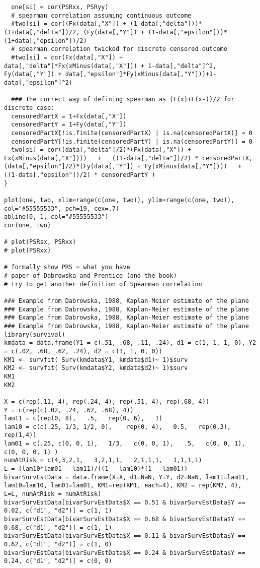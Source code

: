 \documentclass[]{article}
\begin{document}
{{\begin{verbatim}
  one[si] = cor(PSRxx, PSRyy)
  # spearman correlation assuming continuous outcome
  #two[si] = cor((Fx(data[,"X"]) + (1-data[,"delta"]))*(1+data[,"delta"])/2, (Fy(data[,"Y"]) + (1-data[,"epsilon"]))*(1+data[,"epsilon"])/2)
  # spearman correlation twicked for discrete censored outcome
  #two[si] = cor(Fx(data[,"X"]) + data[,"delta"]*Fx(xMinus(data[,"X"])) + 1-data[,"delta"]^2, Fy(data[,"Y"]) + data[,"epsilon"]*Fy(xMinus(data[,"Y"]))+1-data[,"epsilon"]^2)

  ### The correct way of defining spearman as (F(x)+F(x-))/2 for discrete case:
  censoredPartX = 1+Fx(data[,"X"])
  censoredPartY = 1+Fy(data[,"Y"])
  censoredPartX[!is.finite(censoredPartX) | is.na(censoredPartX)] = 0
  censoredPartY[!is.finite(censoredPartY) | is.na(censoredPartY)] = 0
  two[si] = cor((data[,"delta"]/2)*(Fx(data[,"X"]) + Fx(xMinus(data[,"X"])))   +   ((1-data[,"delta"])/2) * censoredPartX,   (data[,"epsilon"]/2)*(Fy(data[,"Y"]) + Fy(xMinus(data[,"Y"])))   +   ((1-data[,"epsilon"])/2) * censoredPartY )
}

plot(one, two, xlim=range(c(one, two)), ylim=range(c(one, two)), col="#55555533", pch=19, cex=.7)
abline(0, 1, col="#55555533")
cor(one, two)

# plot(PSRsx, PSRxx)
# plot(PSRxx)

# formally show PRS = what you have
# paper of Dabrowska and Prentice (and the book)
# try to get another definition of Spearman correlation

### Example from Dabrowska, 1988, Kaplan-Meier estimate of the plane
### Example from Dabrowska, 1988, Kaplan-Meier estimate of the plane
### Example from Dabrowska, 1988, Kaplan-Meier estimate of the plane
### Example from Dabrowska, 1988, Kaplan-Meier estimate of the plane
library(survival)
kmdata = data.frame(Y1 = c(.51, .68, .11, .24), d1 = c(1, 1, 1, 0), Y2 = c(.02, .68, .62, .24), d2 = c(1, 1, 0, 0))
KM1 <- survfit( Surv(kmdata$Y1, kmdata$d1)~ 1)$surv
KM2 <- survfit( Surv(kmdata$Y2, kmdata$d2)~ 1)$surv
KM1
KM2

X = c(rep(.11, 4), rep(.24, 4), rep(.51, 4), rep(.68, 4))
Y = c(rep(c(.02, .24, .62, .68), 4))
lam11 = c(rep(0, 8),   .5,   rep(0, 6),   1)
lam10 = c(c(.25, 1/3, 1/2, 0),    rep(0, 4),   0.5,   rep(0,3),   rep(1,4))
lam01 = c(.25, c(0, 0, 1),   1/3,   c(0, 0, 1),   .5,   c(0, 0, 1),   c(0, 0, 0, 1) )
numAtRisk = c(4,3,2,1,   3,2,1,1,   2,1,1,1,   1,1,1,1)
L = (lam10*lam01 - lam11)/((1 - lam10)*(1 - lam01))
bivarSurvEstData = data.frame(X=X, d1=NaN, Y=Y, d2=NaN, lam11=lam11, lam10=lam10, lam01=lam01, KM1=rep(KM1, each=4), KM2 = rep(KM2, 4), L=L, numAtRisk = numAtRisk)
bivarSurvEstData[bivarSurvEstData$X == 0.51 & bivarSurvEstData$Y == 0.02, c("d1", "d2")] = c(1, 1)
bivarSurvEstData[bivarSurvEstData$X == 0.68 & bivarSurvEstData$Y == 0.68, c("d1", "d2")] = c(1, 1)
bivarSurvEstData[bivarSurvEstData$X == 0.11 & bivarSurvEstData$Y == 0.62, c("d1", "d2")] = c(1, 0)
bivarSurvEstData[bivarSurvEstData$X == 0.24 & bivarSurvEstData$Y == 0.24, c("d1", "d2")] = c(0, 0)


\end{verbatim}}}
\end{document}
